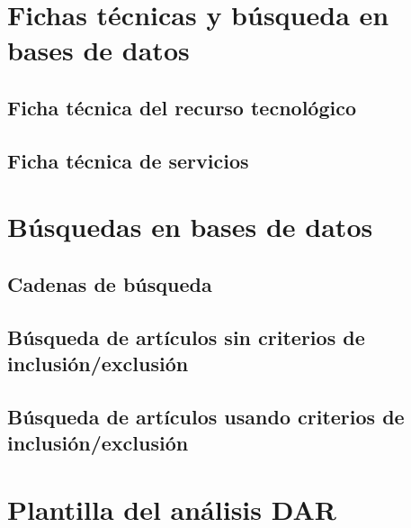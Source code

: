 \appendix

\chapter{Fichas técnicas y búsqueda en bases de datos}\label{apendice:fichas-y-busquedas}

\FloatBarrier\section{Ficha técnica del recurso tecnológico}


\FloatBarrier\section{Ficha técnica de servicios}


\FloatBarrier\chapter{Búsquedas en bases de datos}

\section{Cadenas de búsqueda}\label{sec:cadenas-busqueda}



\section{Búsqueda de artículos sin criterios de inclusión/exclusión}\label{sec:busqueda-sin-criterios}


\FloatBarrier\section{Búsqueda de artículos usando criterios de inclusión/exclusión}\label{sec:busqueda-con-criterios}



\FloatBarrier\chapter{Plantilla del análisis DAR}




